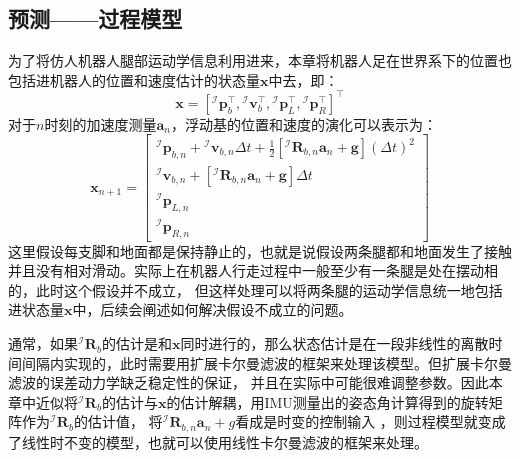 \subsection{预测——过程模型}
为了将仿人机器人腿部运动学信息利用进来，本章将机器人足在世界系下的位置也包括进机器人的位置和速度估计的状态量$\boldsymbol{x}$中去，即：
\begin{equation}
    \label{equ:est_posvel}
    \boldsymbol{x}=\left[{ }^\mathcal{I} \boldsymbol{p}_b^{\top},{ }^\mathcal{I} \boldsymbol{v}_b^{\top},{ }^\mathcal{I} \boldsymbol{p}_L^{\top},{ }^\mathcal{I} \boldsymbol{p}_R^{\top}\right]^{\top}
\end{equation}
对于$n$时刻的加速度测量$\boldsymbol{a}_n$，浮动基的位置和速度的演化可以表示为：
\begin{equation}
    \label{equ:est_posvel}
    \boldsymbol{x}_{n+1}=\left[\begin{array}{c}
        { }^{\mathcal{I}} \boldsymbol{p}_{b, n}+{ }^{\mathcal{I}} \boldsymbol{v}_{b, n} \Delta t+\frac{1}{2}\left[{ }^{\mathcal{I}} \boldsymbol{R}_{b, n} \boldsymbol{a}_n+\boldsymbol{g}\right](\Delta t)^2 \\
        { }^{\mathcal{I}} \boldsymbol{v}_{b, n}+\left[{ }^{\mathcal{I}} \boldsymbol{R}_{b, n} \boldsymbol{a}_n+\boldsymbol{g}\right] \Delta t \\
        { }^{\mathcal{I}} \boldsymbol{p}_{L, n} \\
        { }^{\mathcal{I}} \boldsymbol{p}_{R, n}
        \end{array}\right]
\end{equation}
这里假设每支脚和地面都是保持静止的，也就是说假设两条腿都和地面发生了接触并且没有相对滑动。实际上在机器人行走过程中一般至少有一条腿是处在摆动相的，此时这个假设并不成立，
但这样处理可以将两条腿的运动学信息统一地包括进状态量$\boldsymbol{x}$中，后续会阐述如何解决假设不成立的问题。

通常，如果${ }^{\mathcal{I}} \boldsymbol{R}_{b}$的估计是和$\boldsymbol{x}$同时进行的，那么状态估计是在一段非线性的离散时间间隔内实现的，此时需要用扩展卡尔曼滤波的框架来处理该模型。但扩展卡尔曼滤波的误差动力学缺乏稳定性的保证，
并且在实际中可能很难调整参数。因此本章中近似将${ }^{\mathcal{I}} \boldsymbol{R}_{b}$的估计与$\boldsymbol{x}$的估计解耦，用IMU测量出的姿态角计算得到的旋转矩阵作为${ }^{\mathcal{I}} \boldsymbol{R}_{b}$的估计值，
将${ }^{\mathcal{I}} \boldsymbol{R}_{b, n} \boldsymbol{a}_n+g$看成是时变的控制输入 ，则过程模型就变成了线性时不变的模型，也就可以使用线性卡尔曼滤波的框架来处理。
